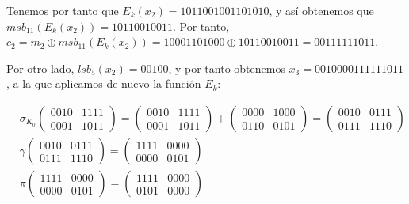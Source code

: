 \documentclass[fleqn]{article}
\begin{document}
    Tenemos por tanto que $E_k(x_2) = 1011001001101010$, y así obtenemos que $msb_{11}(E_k(x_2)) = 10110010011$. Por tanto,
    $c_2 = m_2 \oplus msb_{11}(E_k(x_2)) = 10001101000 \oplus 10110010011 = 00111111011$.

    Por otro lado, $lsb_5(x_2) = 00100$, y por tanto obtenemos $x_3 = 0010000111111011$, a la que aplicamos de nuevo
    la función $E_k$:

    \begin{equation*}
        \begin{aligned}
            &\sigma_{K_0}
            \begin{pmatrix}
                0010 & 1111 \\
                0001 & 1011
            \end{pmatrix} = 
            \begin{pmatrix}
                0010 & 1111 \\
                0001 & 1011
            \end{pmatrix} + 
            \begin{pmatrix}
                0000 & 1000 \\
                0110 & 0101
            \end{pmatrix} = 
            \begin{pmatrix}
                0010 & 0111 \\
                0111 & 1110
            \end{pmatrix} \\
            &\gamma \begin{pmatrix}
                0010 & 0111 \\
                0111 & 1110
            \end{pmatrix} =
            \begin{pmatrix}
                1111 & 0000 \\
                0000 & 0101
            \end{pmatrix} \\
            &\pi \begin{pmatrix}
                1111 & 0000 \\
                0000 & 0101
            \end{pmatrix} =
            \begin{pmatrix}
                1111 & 0000 \\
                0101 & 0000
            \end{pmatrix} \\

\end{aligned}
\end{equation*}
\end{document}
